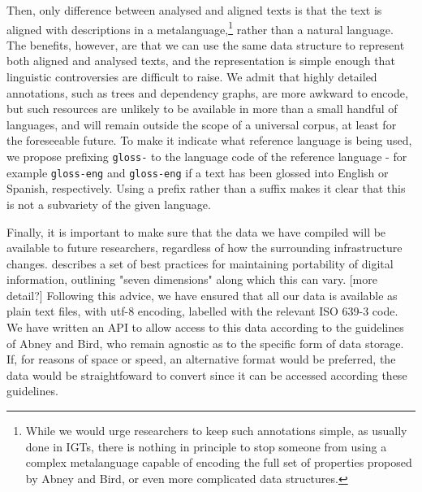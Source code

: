 Then, only difference between analysed and aligned texts is that the text is aligned with descriptions in a metalanguage,\footnote{While we would urge researchers to keep such annotations simple, as usually done in IGTs, there is nothing in principle to stop someone from using a complex metalanguage capable of encoding the full set of properties proposed by Abney and Bird, or even more complicated data structures.} rather than a natural language. The benefits, however, are that we can use the same data structure to represent both aligned and analysed texts, and the representation is simple enough that linguistic controversies are difficult to raise. We admit that highly detailed annotations, such as trees and dependency graphs, are more awkward to encode, but such resources are unlikely to be available in more than a small handful of languages, and will remain outside the scope of a universal corpus, at least for the foreseeable future. To make it indicate what reference language is being used, we propose prefixing \texttt{gloss-} to the language code of the reference language - for example \texttt{gloss-eng} and \texttt{gloss-eng} if a text has been glossed into English or Spanish, respectively. Using a prefix rather than a suffix makes it clear that this is not a subvariety of the given language.

Finally, it is important to make sure that the data we have compiled will be available to future researchers, regardless of how the surrounding infrastructure changes.  describes a set of best practices for maintaining portability of digital information, outlining "seven dimensions" along which this can vary. [more detail?] Following this advice, we have ensured that all our data is available as plain text files, with utf-8 encoding, labelled with the relevant ISO 639-3 code. We have written an API to allow access to this data according to the guidelines of Abney and Bird, who remain agnostic as to the specific form of data storage. If, for reasons of space or speed, an alternative format would be preferred, the data would be straightfoward to convert since it can be accessed according these guidelines.


